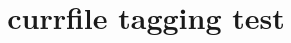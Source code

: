 \documentclass{article}
\title{currfile tagging test}
\begin{document}
\currfiledir

\currfilebase

\currfileext

\currfilename

\currfilepath

\currfileabsdir

\currfileabspath
\end{document}
